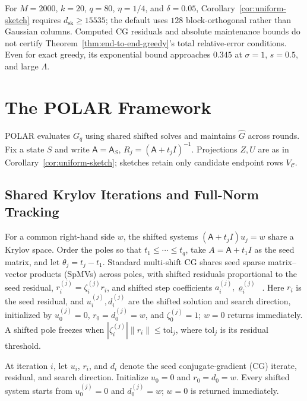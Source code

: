 \documentclass[conference]{IEEEtran}
\theoremstyle{definition}
\newcommand{\POLAR}{\textsc{POLAR}}
\newcommand{\dsk}{d_{\mathrm{sk}}}
\newcommand{\matA}{\mathsf A}
\begin{document}
For $M=2000$, $k=20$, $q=80$, $\eta=1/4$, and $\delta=0.05$,
Corollary~\ref{cor:uniform-sketch} requires $\dsk\ge15535$;
the default uses $128$ block-orthogonal rather than Gaussian columns.
Computed CG residuals and absolute maintenance bounds do not certify
Theorem~\ref{thm:end-to-end-greedy}'s total relative-error conditions.
Even for exact greedy, its exponential bound approaches $0.345$
at $\sigma=1$, $s=0.5$, and large $\Lambda$.

\section{The \POLAR{} Framework}
\label{sec:framework}

\POLAR{} evaluates $G_q$ using shared shifted solves and maintains
$\widehat G$ across rounds. Fix a state $S$ and write
$\matA=\matA_S$, $R_j=(\matA+t_jI)^{-1}$. Projections $Z,U$
are as in Corollary~\ref{cor:uniform-sketch}; sketches retain
only candidate endpoint rows $V_{\mathcal C}$.

\subsection{Shared Krylov Iterations and Full-Norm Tracking}
\label{sec:shifted-cg}

For a common right-hand side $w$, the shifted systems
$(\matA+t_jI)u_j=w$ share a Krylov space. Order the poles so that
$t_1\le\cdots\le t_q$, take $A=\matA+t_1I$ as the seed matrix,
and let $\theta_j=t_j-t_1$. Standard multi-shift CG shares seed sparse
matrix--vector products (SpMVs) across poles, with shifted residuals proportional to the seed
residual, $r_i^{(j)}=\zeta_i^{(j)}r_i$, and shifted step coefficients
$a_i^{(j)},\varrho_i^{(j)}$~\cite{jegerlehner1996}. Here $r_i$ is the
seed residual, and $u_i^{(j)},d_i^{(j)}$ are the shifted solution and
search direction, initialized by $u_0^{(j)}=0$, $r_0=d_0^{(j)}=w$,
and $\zeta_0^{(j)}=1$; $w=0$ returns immediately. A shifted pole freezes
when $|\zeta_i^{(j)}|\|r_i\|\le\mathrm{tol}_j$, where $\mathrm{tol}_j$ is its
residual threshold.

At iteration $i$, let $u_i$, $r_i$,
and $d_i$ denote the seed conjugate-gradient (CG)
iterate, residual, and search direction. Initialize
$u_0=0$ and $r_0=d_0=w$. Every shifted system starts from $u_0^{(j)}=0$ and $d_0^{(j)}=w$;
$w=0$ is returned immediately.
\end{document}
